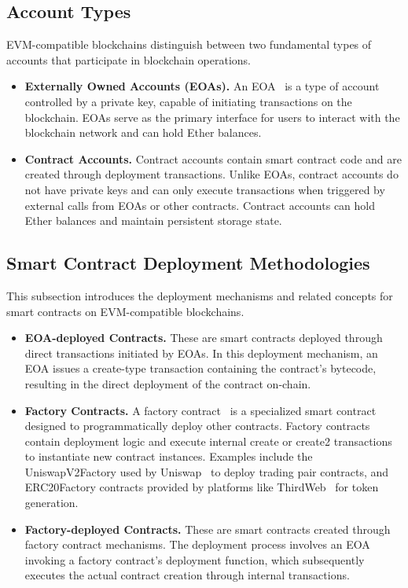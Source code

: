 \documentclass[acmsmall, screen]{acmart}
\begin{document}
	\subsection{Account Types}
	EVM-compatible blockchains distinguish between two fundamental types of accounts that participate
	in blockchain operations.
	\begin{itemize}[leftmargin=0.4cm,topsep=0.1cm]
		\item \textbf{Externally Owned Accounts (EOAs).} An EOA~\cite{ETHAccount} is a type of
		account controlled by a private key, capable of initiating transactions on the blockchain.
		EOAs serve as the primary interface for users to interact with the blockchain network
		and can hold Ether balances.

		\item \textbf{Contract Accounts.} Contract accounts contain smart contract code and are
		created through deployment transactions. Unlike EOAs, contract accounts do not have
		private keys and can only execute transactions when triggered by external calls from
		EOAs or other contracts. Contract accounts can hold Ether balances and maintain persistent
		storage state.
	\end{itemize}

	\subsection{Smart Contract Deployment Methodologies}
	This subsection introduces the deployment mechanisms and related concepts for smart contracts on
	EVM-compatible blockchains.
	\begin{itemize}[leftmargin=0.4cm,topsep=0.1cm]
		\item \textbf{EOA-deployed Contracts.} These are smart contracts deployed through direct
		transactions initiated by EOAs. In this deployment mechanism, an EOA issues a create-type
		transaction containing the contract's bytecode, resulting in the direct deployment of the
		contract on-chain.

		\item \textbf{Factory Contracts.} A factory contract~\cite{factory-contract} is a
		specialized smart contract designed to programmatically deploy other contracts. Factory contracts
		contain deployment logic and execute internal create or create2 transactions to instantiate
		new contract instances. Examples include the UniswapV2Factory used by Uniswap~\cite{uniswap}
		to deploy trading pair contracts, and ERC20Factory contracts provided by platforms like ThirdWeb~\cite{thirdweb}
		for token generation.

		\item \textbf{Factory-deployed Contracts.} These are smart contracts created through factory
		contract mechanisms. The deployment process involves an EOA invoking a factory contract's
		deployment function, which subsequently executes the actual contract creation through
		internal transactions.
	\end{itemize}
\end{document}
